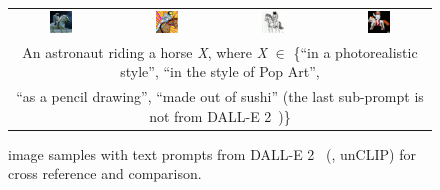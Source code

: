 \begin{figure}[ht!]
\begin{tabular}{cccc}
        \includegraphics[width=0.24\textwidth]{figures/cross/astronaut_0.jpg} &
        \includegraphics[width=0.24\textwidth]{figures/cross/astronaut_1.jpg} &
        \includegraphics[width=0.24\textwidth]{figures/cross/astronaut_2.jpg} &
        \includegraphics[width=0.24\textwidth]{figures/cross/astronaut_3.jpg} \vspace{-1mm}\\
        \multicolumn{4}{c}{\small An astronaut riding a horse \textit{X}, where \textit{X} $\in$ \{``in a photorealistic style'', ``in the style of Pop Art'', }\\
        \multicolumn{4}{c}{\small ``as a pencil drawing'', ``made out of sushi'' (the last sub-prompt is not from DALL-E 2~\cite{ramesh2022hierarchical})\}}\\
    \end{tabular} 
    \caption{\bdraw image samples with text prompts from DALL-E 2~\cite{ramesh2022hierarchical} (\aka, unCLIP) for cross reference and comparison.}
    \label{figs:cross_reference_3}
    \vskip -0.2in
\end{figure}
